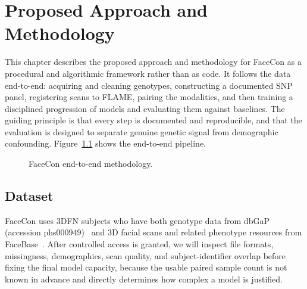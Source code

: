 \chapter{Proposed Approach and Methodology}
\label{ch:method}
This chapter describes the proposed approach and methodology for FaceCon as a procedural and algorithmic framework rather than as code. It follows the data end-to-end: acquiring and cleaning genotypes, constructing a documented SNP panel, registering scans to FLAME, pairing the modalities, and then training a disciplined progression of models and evaluating them against baselines. The guiding principle is that every step is documented and reproducible, and that the evaluation is designed to separate genuine genetic signal from demographic confounding. Figure~\ref{fig:pipeline} shows the end-to-end pipeline.

\begin{figure}[!h]
\centering
{}
\caption{FaceCon end-to-end methodology.}
\label{fig:pipeline}
\end{figure}

\section{Dataset}
FaceCon uses 3DFN subjects who have both genotype data from dbGaP (accession phs000949)~\cite{ref:dbgap} and 3D facial scans and related phenotype resources from FaceBase~\cite{ref:facebase}. After controlled access is granted, we will inspect file formats, missingness, demographics, scan quality, and subject-identifier overlap before fixing the final model capacity, because the usable paired sample count is not known in advance and directly determines how complex a model is justified.

